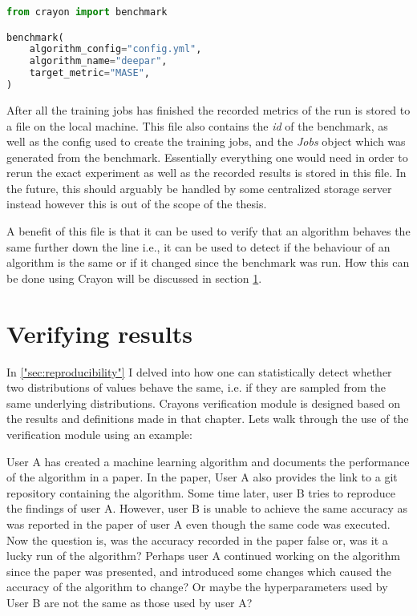 \begin{lstlisting}[language=Python, label={code:benchmarking}, caption=Python script for starting a benchmarking run using Crayon.]
from crayon import benchmark

benchmark(
    algorithm_config="config.yml",
    algorithm_name="deepar",
    target_metric="MASE",
)
\end{lstlisting}

After all the training jobs has finished the recorded metrics of the run is stored to a file on the local machine. This file also contains the \textit{id} of the benchmark, as well as the config used to create the training jobs, and the \textit{Jobs} object which was generated from the benchmark. Essentially everything one would need in order to rerun the exact experiment as well as the recorded results is stored in this file. In the future, this should arguably be handled by some centralized storage server instead however this is out of the scope of the thesis. 

A benefit of this file is that it can be used to verify that an algorithm behaves the same further down the line i.e., it can be used to detect if the behaviour of an algorithm is the same or if it changed since the benchmark was run. How this can be done using Crayon will be discussed in section \ref{subsec:verifying_results}. 

\section{Verifying results}
\label{subsec:verifying_results}
In \ref{"sec:reproducibility"} I delved into how one can statistically detect whether two distributions of values behave the same, i.e. if they are sampled from the same underlying distributions. Crayons verification module is designed based on the results and definitions made in that chapter. Lets walk through the use of the verification module using an example:

User A has created a machine learning algorithm and documents the performance of the algorithm in a paper. In the paper, User A also provides the link to a git repository containing the algorithm. Some time later, user B tries to reproduce the findings of user A. However, user B is unable to achieve the same accuracy as was reported in the paper of user A even though the same code was executed. Now the question is, was the accuracy recorded in the paper false or, was it a lucky run of the algorithm? Perhaps user A continued working on the algorithm since the paper was presented, and introduced some changes which caused the accuracy of the algorithm to change? Or maybe the hyperparameters used by User B are not the same as those used by user A?

